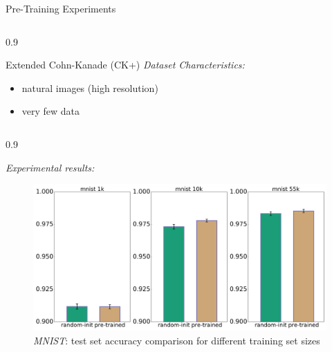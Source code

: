 \documentclass[final]{beamer}
\newlength{\onecolwid}
\newlength{\threecolwid}
\begin{document}
\begin{frame}[t]
\begin{columns}[t]
\begin{column}{\threecolwid}
\begin{alertblock}{Pre-Training Experiments}
\begin{columns}[t, totalwidth=0.9\threecolwid]
\begin{column}{0.9\onecolwid}
\begin{block}{Extended Cohn-Kanade (CK+)}
\emph{Dataset Characteristics:}\\
\begin{itemize}
	\item natural images (high resolution) 
	\item very few data
\end{itemize}

\end{block}

\end{column}

\end{columns}


\begin{columns}[t, totalwidth=0.9\threecolwid] %


\begin{column}{0.9\onecolwid} %
\begin{block}{}
\emph{Experimental results:}

\begin{figure}
\includegraphics[width=\linewidth]{box_plots/boxplots_mnist.png}
\caption{\emph{MNIST}: test set accuracy comparison for different training set sizes}
\end{figure}


\end{block}
\end{column}
\end{columns}
\end{alertblock}
\end{column}
\end{columns}
\end{frame}
\end{document}
